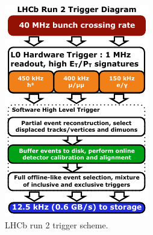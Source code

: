 \begin{figure}[!htb]
    \centering
    \begin{subfigure}[t]{0.36\textwidth}
        \centering
        \includegraphics[width=\textwidth]{./figs-lhcb-upgrade-overview/trigger/trigger_scheme_run2.pdf}
        \caption{LHCb run 2 trigger scheme.}
    \end{subfigure}
    \hspace{20pt}
    \begin{subfigure}[t]{0.36\textwidth}
        \centering

\end{subfigure}
\end{figure}
